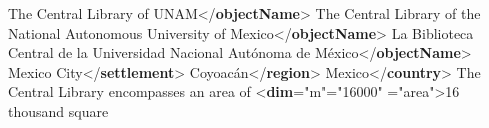 \begin{shaded}
\hspace*{1em}The Central Library of UNAM{</\textbf{objectName}>}\mbox{}\newline 
\hspace*{1em}The Central Library of the National Autonomous University of Mexico{</\textbf{objectName}>}\mbox{}\newline 
\hspace*{1em}La Biblioteca Central de la Universidad Nacional Autónoma de México{</\textbf{objectName}>}\mbox{}\newline 
\hspace*{1em}Mexico City{</\textbf{settlement}>}\mbox{}\newline 
\hspace*{1em}Coyoacán{</\textbf{region}>}\mbox{}\newline 
\hspace*{1em}Mexico{</\textbf{country}>}\mbox{}\newline 
{}\mbox{}\newline 
{}\mbox{}\newline 
\hspace*{1em}\mbox{}\newline 
\hspace*{1em}\hspace*{1em}The Central Library encompasses an area of {<\textbf{dim}\hspace*{1em}{unit}="{m}"\hspace*{1em}{quantity}="{16000}"\mbox{}\newline 
\hspace*{1em}\hspace*{1em}\hspace*{1em}\hspace*{1em}\hspace*{1em}{type}="{area}">}16 thousand square\mbox{}\newline 

\end{shaded}
